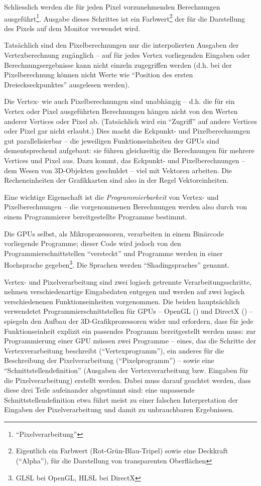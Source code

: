 \documentclass[twoside,a4paper,fleqn,12pt]{book}
\begin{document}
Schliesslich werden die für jeden Pixel vorzunehmenden Berechnungen ausgeführt\footnote{"`Pixelverarbeitung"'}.
Ausgabe dieses Schrittes ist ein Farbwert\footnote{Eigentlich ein Farbwert (Rot-Grün-Blau-Tripel) sowie eine Deckkraft ("`Alpha"'), für die Darstellung von transparenten Oberflächen}
der für die Darstellung des Pixels auf dem Monitor verwendet wird.

Tatsächlich sind den Pixelberechnungen nur die interpolierten Ausgaben der Vertexberechnung zugänglich -- auf für jedes Vertex vorliegenden
Eingaben oder Berechnungsergebnisse kann nicht einzeln zugegriffen werden (d.h. bei der Pixelberechnung können nicht Werte wie
"`Position des ersten Dreieckseckpunktes"' ausgelesen werden).

Die Vertex- wie auch Pixelberechnungen sind unabhängig -- d.h. die für ein Vertex oder Pixel ausgeführten Berechnungen hängen
nicht von den Werten anderer Vertices oder Pixel ab. (Tatsächlich wird ein "`Zugriff"' auf andere Vertices oder Pixel gar nicht erlaubt.)
Dies macht die Eckpunkt- und Pixelberechnungen gut parallelisierbar -- die jeweiligen Funktionseinheiten der GPUs sind dementsprechend aufgebaut:
sie führen gleichzeitig die Berechnungen für mehrere Vertices und Pixel aus.
Dazu kommt, das Eckpunkt- und Pixelberechnungen -- dem Wesen von 3D-Objekten geschuldet -- viel mit Vektoren arbeiten. Die Recheneinheiten
der Grafikkarten sind also in der Regel Vektoreinheiten.

Eine wichtige Eigenschaft ist die \emph{Programmierbarkeit} von Vertex- und Pixelberechnungen
-- die vorgenommenen Berechnungen werden also durch von einem Programmierer bereitgestellte
Programme bestimmt. 

Die GPUs selbst, als Mikroprozessoren, verarbeiten in einem Binärcode vorliegende Programme; dieser Code
wird jedoch von den Programmierschnittstellen "`versteckt"' und Programme werden in einer Hochsprache gegeben\footnote{GLSL bei OpenGL, HLSL bei DirectX}.
Die Sprachen werden "`\glspl{Shadingsprache}"' genannt.

Vertex- und Pixelverarbeitung sind zwei logisch getrennte Verarbeitungsschritte, nehmen verschiedenartige Eingabedaten entgegen und
werden auf zwei logisch verschiedenenen Funktionseinheiten vorgenommen. 
Die beiden hauptsächlich verwendetet Programmierschnittstellen für GPUs -- OpenGL (\cite{glspec4}) und DirectX (\cite{dx10}) -- spiegeln 
den Aufbau der 3D-Grafikprozessoren wider und erfordern, dass für jede Funktionseinheit explizit ein passendes Programm bereitgestellt werden muss:
zur Programmierung einer GPU müssen zwei Programme -- eines, das die Schritte der Vertexverarbeitung beschreibt ("`Vertexprogramm"'),
ein anderes für die Beschreibung der Pixelverarbeitung ("`Pixelprogramm"')
-- sowie eine "`Schnittstellendefinition"' (Ausgaben der Vertexverarbeitung bzw. Eingaben für die Pixelverarbeitung) erstellt werden.
Dabei muss darauf geachtet werden, dass diese drei Teile aufeinander abgestimmt sind: eine unpassende Schnittstellendefinition etwa
führt meist zu einer falschen Interpretation der Eingaben der Pixelverarbeitung und damit zu unbrauchbaren Ergebnissen.
\end{document}
